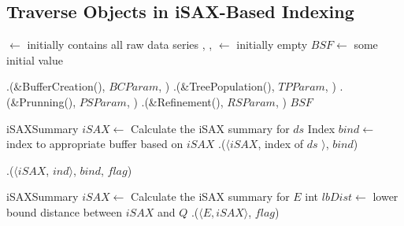 \subsection{Traverse Objects in iSAX-Based Indexing}

\begin{algorithm}[htbp]
    \footnotesize
    \vspace*{2mm}
    
    \begin{algorithmic}[1]
    
        \State \BC $\gets$ initially contains all raw data series
        \State \TP, \PS, \RS $\gets$ initially empty
        \State $\mathit{BSF} \gets$ some initial value
    \EndProcedure
    
    \vspace*{1mm}
    \vspace*{1mm}


        \State \BC.\Traverse(\&BufferCreation(), $\mathit{BCParam}$, \False)
        \State \TP.\Traverse(\&TreePopulation(), $\mathit{TPParam}$, \False)
        \State \PS.\Traverse(\&Prunning(), $\mathit{PSParam}$, \False)
        \State \RS.\Traverse(\&Refinement(), $\mathit{RSParam}$, \True)
        \State \Return $\mathit{BSF}$
    \EndProcedure
    
    \vspace*{1mm}
        \State iSAXSummary $\mathit{iSAX} \gets$ Calculate the iSAX summary for $\mathit{ds}$
        \State Index $\mathit{bind} \gets$ index to appropriate buffer based on $\mathit{iSAX}$
        \State \TP.\Put($\langle \mathit{iSAX}$, index of $\mathit{ds}$ $\rangle$, $\mathit{bind}$)
    \EndProcedure
    
    \vspace*{1mm}
        \State \PS.\Put($\langle \mathit{iSAX}$, $\mathit{ind} \rangle$, $\mathit{bind}$, $\mathit{flag}$)
    \EndProcedure
    
    \vspace*{1mm}
            \State iSAXSummary $\mathit{iSAX} \gets$ Calculate the iSAX summary for $\mathit{E}$
            \State int $\mathit{lbDist} \gets$ lower bound distance between $\mathit{iSAX}$ and $Q$
                \State \RS.\Put($\langle \mathit{E, iSAX} \rangle$, $\mathit{flag}$)
                \Return \True
            \EndIf
            \Return \False
    \EndProcedure
    

\end{algorithmic}
\end{algorithm}
